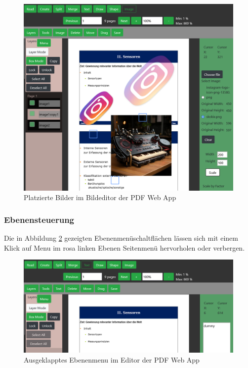 \begin{figure}[!htbp]
	\centering
	\includegraphics[width=1\textwidth]{"images/imaging.png"}
	\caption{Platzierte Bilder im Bildeditor der PDF Web App}
	\label{fig:imaging}
\end{figure}



\subsubsection{Ebenensteuerung}
Die in Abbildung \ref{fig:ebenenmenu} gezeigten Ebenenmenüschaltflächen lässen sich mit einem Klick auf Menu im rosa linken Ebenen Seitenmenü hervorholen oder verbergen. 

\begin{figure}[!htbp]
	\centering
	\includegraphics[width=1\textwidth]{"images/ebenenmenu.png"}
	\caption{Ausgeklapptes Ebenenmenu im Editor der PDF Web App}
	\label{fig:ebenenmenu}
\end{figure}

